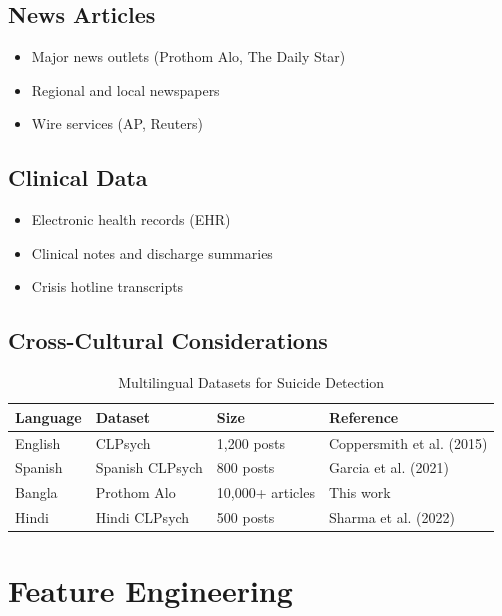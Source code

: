 \documentclass[12pt,a4paper]{article}
\begin{document}
\subsection{News Articles}
\begin{itemize}
    \item Major news outlets (Prothom Alo, The Daily Star)
    \item Regional and local newspapers
    \item Wire services (AP, Reuters)
\end{itemize}

\subsection{Clinical Data}
\begin{itemize}
    \item Electronic health records (EHR)
    \item Clinical notes and discharge summaries
    \item Crisis hotline transcripts
\end{itemize}

\subsection{Cross-Cultural Considerations}
\begin{table}[H]
\centering
\caption{Multilingual Datasets for Suicide Detection}
\label{tab:multilingual}
\begin{tabular}{@{}llll@{}}
\toprule
\textbf{Language} & \textbf{Dataset} & \textbf{Size} & \textbf{Reference} \\
\midrule
English & CLPsych & 1,200 posts & Coppersmith et al. (2015) \\
Spanish & Spanish CLPsych & 800 posts & Garcia et al. (2021) \\
Bangla & Prothom Alo & 10,000+ articles & This work \\
Hindi & Hindi CLPsych & 500 posts & Sharma et al. (2022) \\
\bottomrule
\end{tabular}
\end{table}

\section{Feature Engineering}
\end{document}
